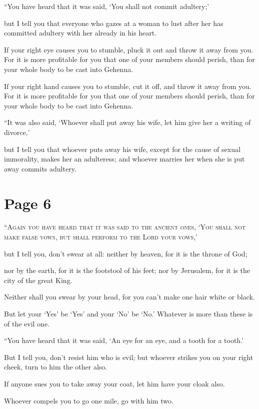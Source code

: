 “You have heard that it was said,  ‘You shall not commit adultery;’

but I tell you that everyone who gazes at a woman to lust after her has committed adultery with her already in his heart.

If your right eye causes you to stumble, pluck it out and throw it away from you. For it is more profitable for you that one of your members should perish, than for your whole body to be cast into Gehenna.

If your right hand causes you to stumble, cut it off, and throw it away from you. For it is more profitable for you that one of your members should perish, than for your whole body to be cast into Gehenna.

“It was also said, ‘Whoever shall put away his wife, let him give her a writing of divorce,’

but I tell you that whoever puts away his wife, except for the cause of sexual immorality, makes her an adulteress; and whoever marries her when she is put away commits adultery.



\chapterornament
\section*{Page 6}

\lettrine{“}{Again you have heard that it was said to the ancient ones, ‘You shall not make false vows, but shall perform to the Lord your vows,’}

but I tell you, don’t swear at all: neither by heaven, for it is the throne of God;

nor by the earth, for it is the footstool of his feet; nor by Jerusalem, for it is the city of the great King.

Neither shall you swear by your head, for you can’t make one hair white or black.

But let your ‘Yes’ be ‘Yes’ and your ‘No’ be ‘No.’ Whatever is more than these is of the evil one.

“You have heard that it was said, ‘An eye for an eye, and a tooth for a tooth.’

But I tell you, don’t resist him who is evil; but whoever strikes you on your right cheek, turn to him the other also.

If anyone sues you to take away your coat, let him have your cloak also.

Whoever compels you to go one mile, go with him two.

